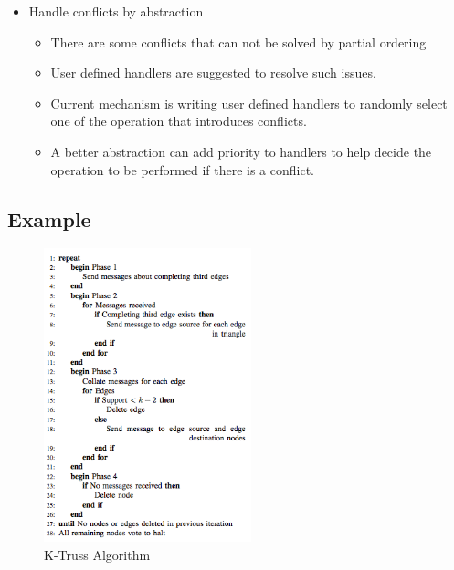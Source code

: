 \begin{frame}	
		 \begin{itemize}
		      \item Handle conflicts by abstraction
		      \linebreak
		   	  \begin{itemize}
				\item There are some conflicts that can not be solved by partial ordering 
				\item User defined handlers are suggested to resolve such issues.
				\item Current mechanism is writing user defined handlers to randomly select one of the operation that introduces conflicts.
				\item A better abstraction can add priority to handlers to help decide the operation to be performed if there is a conflict.
		     	  \end{itemize}
		  \end{itemize}
\end{frame}


\subsection{Example}
\begin{frame}
 \begin{figure}
		\includegraphics[width=6cm, height=5 cm, angle=0]{figures/example.jpg}
		\caption{K-Truss Algorithm }
		\end{figure}
		\let\thefootnote\relax{}
\end{frame}